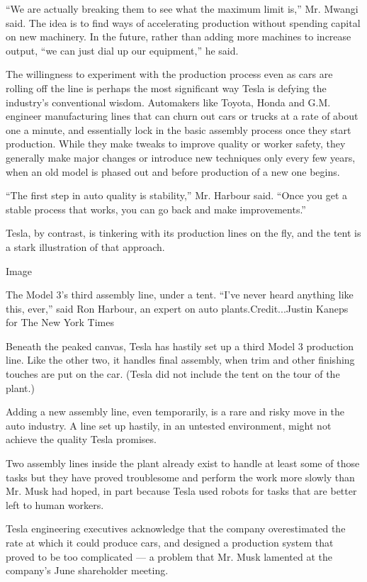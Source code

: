 ``We are actually breaking them to see what the maximum limit is,'' Mr.
Mwangi said. The idea is to find ways of accelerating production without
spending capital on new machinery. In the future, rather than adding
more machines to increase output, ``we can just dial up our equipment,''
he said.

The willingness to experiment with the production process even as cars
are rolling off the line is perhaps the most significant way Tesla is
defying the industry's conventional wisdom. Automakers like Toyota,
Honda and G.M. engineer manufacturing lines that can churn out cars or
trucks at a rate of about one a minute, and essentially lock in the
basic assembly process once they start production. While they make
tweaks to improve quality or worker safety, they generally make major
changes or introduce new techniques only every few years, when an old
model is phased out and before production of a new one begins.

``The first step in auto quality is stability,'' Mr. Harbour said.
``Once you get a stable process that works, you can go back and make
improvements.''

Tesla, by contrast, is tinkering with its production lines on the fly,
and the tent is a stark illustration of that approach.

Image

The Model 3's third assembly line, under a tent. ``I've never heard
anything like this, ever,'' said Ron Harbour, an expert on auto
plants.Credit...Justin Kaneps for The New York Times

Beneath the peaked canvas, Tesla has hastily set up a third Model 3
production line. Like the other two, it handles final assembly, when
trim and other finishing touches are put on the car. (Tesla did not
include the tent on the tour of the plant.)

Adding a new assembly line, even temporarily, is a rare and risky move
in the auto industry. A line set up hastily, in an untested environment,
might not achieve the quality Tesla promises.

Two assembly lines inside the plant already exist to handle at least
some of those tasks but they have proved troublesome and perform the
work more slowly than Mr. Musk had hoped, in part because Tesla used
robots for tasks that are better left to human workers.

Tesla engineering executives acknowledge that the company overestimated
the rate at which it could produce cars, and designed a production
system that proved to be too complicated --- a problem that Mr. Musk
lamented at the company's June shareholder meeting.

